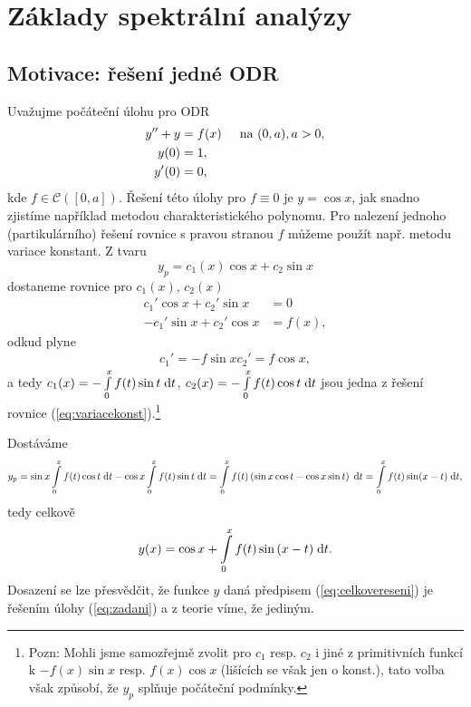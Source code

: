 \section{Základy spektrální analýzy}

\subsection{Motivace: řešení jedné ODR}
\Priklad 

Uvažujme počáteční úlohu pro ODR
\begin{equation}
    \begin{split}
        y''+y&=f(x) \text{\;\;\;\; na } (0,a), a>0,\\
        y(0)&=1,\\
        y'(0)&=0,
    \end{split}
    \label{eq:zadani}
\end{equation}
kde $f\in \mathcal{C}( [0, a] )$. Řešení této úlohy pro $f\equiv 0$ je $y=\cos x$, jak snadno zjistíme například metodou charakteristického polynomu. Pro nalezení jednoho (partikulárního) řešení rovnice s pravou stranou $f$ můžeme použít např. metodu variace konstant. Z tvaru
\begin{equation}
    y_p=c_1(x) \cos x+c_2 \sin x
\end{equation}
dostaneme rovnice pro $c_1(x)$, $c_2(x)$
\begin{equation}
    \begin{split}
        c_1'\cos x+c_2'\sin x&=0\\
        -c_1'\sin x+c_2'\cos x&=f(x),
    \end{split}
    \label{eq:variacekonst}
\end{equation}
odkud plyne
\begin{equation}
    \begin{split}
        c_1'=-f \sin x
        c_2'=f\cos x,
    \end{split}
\end{equation}
a tedy $ c_1(x) = -\int\limits_0^xf(t)\sin t \;\mathrm{d}t$, $ c_2(x) = -\int\limits_0^xf(t)\cos t \;\mathrm{d}t$ jsou jedna z řešení rovnice (\ref{eq:variacekonst}).\footnote{Pozn: Mohli jsme samozřejmě zvolit pro $c_1$ resp. $c_2$ i jiné z primitivních funkcí k $-f(x)\sin x$ resp. $f(x) \cos x$ (lišících se však jen o konst.), tato volba však způsobí, že $y_p$ splňuje počáteční podmínky.}

Dostáváme
\begin{equation}
        y_p=\sin x \int\limits_0^xf(t)\cos t\;\mathrm{d}t-\cos x\int\limits_0^x f(t)\sin t\;\mathrm{d}t=\int\limits_0^x f(t)\left(\sin x \cos t-\cos x\sin t\right) \;\mathrm{d}t= \int\limits_0^xf(t) \sin(x-t)\;\mathrm{d}t,
\end{equation}
tedy celkově
\begin{equation}
    y(x)=\cos x+\int\limits_0^x f(t)\sin{(x-t)}\;\mathrm{d}t.
    \label{eq:celkovereseni}
\end{equation}
Dosazení se lze přesvědčit, že funkce $y$ daná předpisem (\ref{eq:celkovereseni}) je řešením úlohy (\ref{eq:zadani}) a z teorie víme, že jediným.

